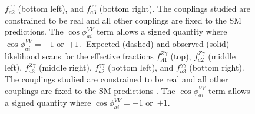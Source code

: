 \begin{figure}
	$f_{a2}^{\gamma\gamma}$ (bottom left), and  $f_{a3}^{\gamma\gamma}$ (bottom right).
	The couplings studied are constrained to be real and all other couplings are fixed to the SM predictions.
	The $\cos\phi_{ai}^{VV}$ term allows a signed quantity where $\cos\phi_{ai}^{VV}=-1$ or~$+1$.]{
	Expected (dashed) and observed (solid)  likelihood scans for the effective fractions
	$f_{\Lambda1}^{Z\gamma}$ (top), $f_{a2}^{Z\gamma}$ (middle left), $f_{a3}^{Z\gamma}$ (middle right),
	$f_{a2}^{\gamma\gamma}$ (bottom left), and  $f_{a3}^{\gamma\gamma}$ (bottom right).
	The couplings studied are constrained to be real and all other couplings are fixed to the SM predictions \cite{Khachatryan:2014kca}.
	The $\cos\phi_{ai}^{VV}$ term allows a signed quantity where $\cos\phi_{ai}^{VV}=-1$ or~$+1$.
	}
	\label{fig:results_ZA_AA_1D}

\end{figure}

